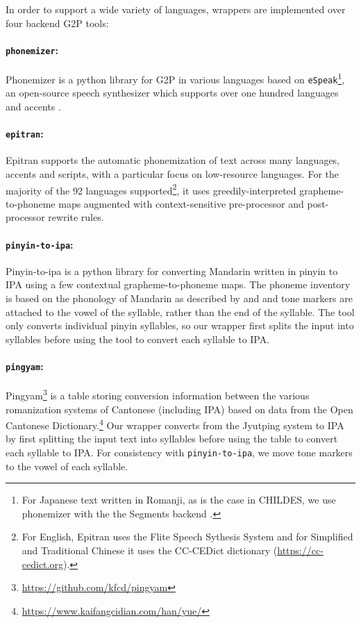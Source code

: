 In order to support a wide variety of languages, wrappers are implemented over four backend G2P tools:

\paragraph{\texttt{phonemizer}:} Phonemizer \citep{Bernard2021} is a python library for G2P in various languages based on \texttt{eSpeak}\footnote{For Japanese text written in Romanji, as is the case in CHILDES, we use phonemizer with the the Segments backend \citep{robert_forkel_2019_3549784}.}, an open-source speech synthesizer which supports over one hundred languages and accents \citep{Dunn2019}.

\paragraph{\texttt{epitran}:} Epitran \citep{Mortensen-et-al:2018} supports the automatic phonemization of text across many languages, accents and scripts, with a particular focus on low-resource languages. For the majority of the 92 languages supported\footnote{For English, Epitran uses the Flite Speech Sythesis System \citep{black2001flite} and for Simplified and Traditional Chinese it uses the CC-CEDict dictionary (\url{https://cc-cedict.org}).}, it uses greedily-interpreted grapheme-to-phoneme maps augmented with context-sensitive pre-processor and post-processor rewrite rules.

\paragraph{\texttt{pinyin-to-ipa}:} Pinyin-to-ipa \citep{taubert_2024_pinyin-to-ipa_2024} is a python library for converting Mandarin written in pinyin to IPA using a few contextual grapheme-to-phoneme maps. The phoneme inventory is based on the phonology of Mandarin as described by \cite{lin2007sounds} and \cite{duanmu2007phonology} and tone markers are attached to the vowel of the syllable, rather than the end of the syllable. The tool only converts individual pinyin syllables, so our wrapper first splits the input into syllables before using the tool to convert each syllable to IPA.

\paragraph{\texttt{pingyam}:} Pingyam\footnote{\url{https://github.com/kfcd/pingyam}} is a table storing conversion information between the various romanization systems of Cantonese (including IPA) based on data from the Open Cantonese Dictionary.\footnote{\url{https://www.kaifangcidian.com/han/yue/}} Our wrapper converts from the Jyutping system to IPA by first splitting the input text into syllables before using the table to convert each syllable to IPA. For consistency with \texttt{pinyin-to-ipa}, we move tone markers to the vowel of each syllable. 


